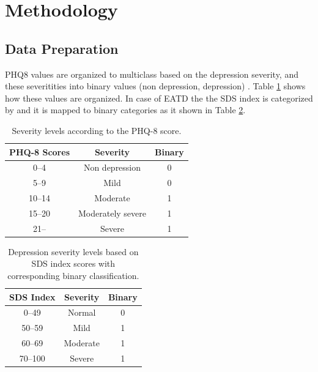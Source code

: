 \section{Methodology}

\subsection{Data Preparation}

PHQ8 values are organized to multiclass \cite{kroenke2001phq} based on the depression severity, and these severitities into binary values (non depression, depression) \cite{kroenke2009phq}. Table \ref{tab:phq8_severity} shows how these values are organized. In case of EATD the the SDS index is categorized by and it is mapped to binary categories as it shown in Table \ref{tab:sds_index_classification}.



\begin{table}[H]
    \centering
    \caption{Severity levels according to the PHQ-8 score.}
    \begin{tabular}{|c|c|c|}
    \hline
    \textbf{PHQ-8 Scores} & \textbf{Severity} & \textbf{Binary} \\
    \hline
    0--4 & Non depression & 0 \\
    5--9 & Mild & 0 \\
    10--14 & Moderate & 1 \\
    15--20 & Moderately severe & 1 \\
    21-- & Severe & 1 \\
    \hline
    \end{tabular}
    
    \label{tab:phq8_severity}
\end{table}

\begin{table}[H]
    \centering
    \caption{Depression severity levels based on SDS index scores with corresponding binary classification.}
    \begin{tabular}{|c|c|c|}
    \hline
    \textbf{SDS Index} & \textbf{Severity} & \textbf{Binary} \\
    \hline
    0--49 & Normal & 0 \\
    50--59 & Mild & 1 \\
    60--69 & Moderate & 1 \\
    70--100 & Severe & 1 \\
    \hline
    \end{tabular}
    
    \label{tab:sds_index_classification}
\end{table}


